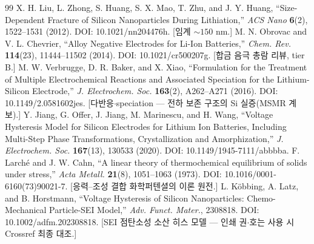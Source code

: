 \begin{thebibliography}{99}
 X. H. Liu, L. Zhong, S. Huang, S. X. Mao, T. Zhu, and J. Y. Huang, ``Size-Dependent Fracture of Silicon Nanoparticles During Lithiation,'' \emph{ACS Nano} \textbf{6}(2), 1522--1531 (2012). DOI: 10.1021/nn204476h. [임계 $\sim150$ nm.]
 M. N. Obrovac and V. L. Chevrier, ``Alloy Negative Electrodes for Li-Ion Batteries,'' \emph{Chem. Rev.} \textbf{114}(23), 11444--11502 (2014). DOI: 10.1021/cr500207g. [합금 음극 총람 리뷰, tier B.]
 M. W. Verbrugge, D. R. Baker, and X. Xiao, ``Formulation for the Treatment of Multiple Electrochemical Reactions and Associated Speciation for the Lithium-Silicon Electrode,'' \emph{J. Electrochem. Soc.} \textbf{163}(2), A262--A271 (2016). DOI: 10.1149/2.0581602jes. [다반응$\cdot$speciation --- 전하 보존 구조의 Si 실증(MSMR 계보).]
 Y. Jiang, G. Offer, J. Jiang, M. Marinescu, and H. Wang, ``Voltage Hysteresis Model for Silicon Electrodes for Lithium Ion Batteries, Including Multi-Step Phase Transformations, Crystallization and Amorphization,'' \emph{J. Electrochem. Soc.} \textbf{167}(13), 130533 (2020). DOI: 10.1149/1945-7111/abbbba.
 F. Larch\'e and J. W. Cahn, ``A linear theory of thermochemical equilibrium of solids under stress,'' \emph{Acta Metall.} \textbf{21}(8), 1051--1063 (1973). DOI: 10.1016/0001-6160(73)90021-7. [응력--조성 결합 화학퍼텐셜의 이론 원전.]
 L. K\"obbing, A. Latz, and B. Horstmann, ``Voltage Hysteresis of Silicon Nanoparticles: Chemo-Mechanical Particle-SEI Model,'' \emph{Adv. Funct. Mater.}, 2308818. DOI: 10.1002/adfm.202308818. [SEI 점탄소성 소산 히스 모델 --- 인쇄 권$\cdot$호는 사용 시 Crossref 최종 대조.]


\end{thebibliography}
